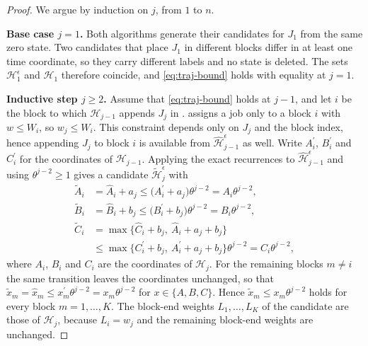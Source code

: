 \documentclass[12pt]{article}
\begin{document}
\begin{sloppypar}
        \begin{proof}
            We argue by induction on $j$, from $1$ to $n$.
            
            \textbf{Base case $j=1$.} Both algorithms generate their candidates for $J_1$ from the same zero
            state. Two candidates that place $J_1$ in different blocks differ in at least one time coordinate,
            so they carry different labels and no state is deleted. The sets $\mathscr{H}^{\epsilon}_{1}$ and
            $\mathscr{H}_{1}$ therefore coincide, and \cref{eq:traj-bound} holds with equality at $j=1$.
            
            \textbf{Inductive step $j\ge2$.} Assume that \cref{eq:traj-bound} holds at $j-1$, and let $i$ be the
            block to which $\mathscr{H}_{j-1}$ appends $J_j$ in . 
            assigns a job only to a block $i$ with $w\le W_i$, so $w_j\le W_i$. This constraint depends only on
            $J_j$ and the block index, hence appending $J_j$ to block $i$ is available from
            $\hat{\mathscr{H}}^{\epsilon}_{j-1}$ as well. Write $A^{\prime}_i$, $B^{\prime}_i$ and $C^{\prime}_i$
            for the coordinates of $\mathscr{H}_{j-1}$. Applying the exact recurrences to
            $\hat{\mathscr{H}}^{\epsilon}_{j-1}$ and using $\theta^{j-2}\ge1$ gives a candidate
            $\tilde{\mathscr{H}}^{\epsilon}_{j}$ with
            \begin{align*}
                \tilde A_{i} &= \hat A_{i}+a_j
                \le \big(A^{\prime}_{i}+a_j\big)\theta^{j-2}=A_{i}\theta^{j-2},\\
                \tilde B_{i} &= \hat B_{i}+b_j
                \le \big(B^{\prime}_{i}+b_j\big)\theta^{j-2}=B_{i}\theta^{j-2},\\
                \tilde C_{i} &= \max\big\{\hat C_{i}+b_j,\ \hat A_{i}+a_j+b_j\big\}\\
                &\le \max\big\{C^{\prime}_{i}+b_j,\ A^{\prime}_{i}+a_j+b_j\big\}\theta^{j-2}
                = C_{i}\theta^{j-2},
            \end{align*}
            where $A_i$, $B_i$ and $C_i$ are the coordinates of $\mathscr{H}_{j}$. For the remaining blocks
            $m\ne i$ the same transition leaves the coordinates unchanged, so that
            $\tilde x_m=\hat x_m\le x^{\prime}_m\theta^{j-2}=x_m\theta^{j-2}$ for $x\in\{A,B,C\}$. Hence
            $\tilde x_m\le x_m\theta^{j-2}$ holds for every block $m=1,\dots,K$. The block-end weights
            $L_1,\dots,L_K$ of the candidate are those of $\mathscr{H}_{j}$, because $L_i=w_j$ and the
            remaining block-end weights are unchanged.
            

\end{proof}
\end{sloppypar}
\end{document}
